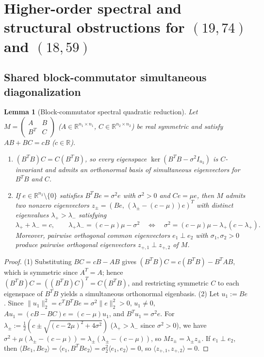 \documentclass[11pt,reqno]{amsart}
\newtheorem{lemma}[theorem]{Lemma}
\theoremstyle{definition}
\theoremstyle{remark}
\numberwithin{equation}{section}
\numberwithin{table}{section}
\begin{document}
\section{Higher-order spectral and structural obstructions for \texorpdfstring{$(19, 74)$}{(19, 74)} and \texorpdfstring{$(18, 59)$}{(18, 59)}}\label{sec:phase3_structural}

\subsection{Shared block-commutator simultaneous diagonalization}
\begin{lemma}[Block-commutator spectral quadratic reduction]\label{lem:block_comm}
Let $M = \left(\begin{smallmatrix} A & B \\ B^T & C \end{smallmatrix}\right)$ ($A \in \mathbb{R}^{n_1 \times n_1}$, $C \in \mathbb{R}^{n_2 \times n_2}$) be real symmetric and satisfy $AB + BC = c B$ ($c \in \mathbb{R}$).
\begin{enumerate}
  \item $(B^T B) C = C (B^T B)$, so every eigenspace $\ker(B^T B - \sigma^2 I_{n_2})$ is $C$-invariant and admits an orthonormal basis of simultaneous eigenvectors for $B^T B$ and $C$.
  \item If $e \in \mathbb{R}^{n_2} \setminus \{0\}$ satisfies $B^T B e = \sigma^2 e$ with $\sigma^2 > 0$ and $C e = \mu e$, then $M$ admits two nonzero eigenvectors $z_\pm = (Be,\, (\lambda_\pm - (c - \mu))e)^T$ with distinct eigenvalues $\lambda_+ > \lambda_-$ satisfying
  \[
    \lambda_+ + \lambda_- = c, \qquad \lambda_+ \lambda_- = (c - \mu)\mu - \sigma^2 \quad \Longleftrightarrow \quad \sigma^2 = (c - \mu)\mu - \lambda_+(c - \lambda_+).
  \]
  Moreover, pairwise orthogonal common eigenvectors $e_1 \perp e_2$ with $\sigma_1, \sigma_2 > 0$ produce pairwise orthogonal eigenvectors $z_{+,1} \perp z_{+,2}$ of $M$.
\end{enumerate}
\end{lemma}

\begin{proof}
(1) Substituting $BC = cB - AB$ gives $(B^T B)C = c(B^T B) - B^T A B$, which is symmetric since $A^T = A$; hence $(B^T B)C = ((B^T B)C)^T = C(B^T B)$, and restricting symmetric $C$ to each eigenspace of $B^T B$ yields a simultaneous orthonormal eigenbasis.
(2) Let $u_1 := Be$. Since $\|u_1\|_2^2 = e^T B^T B e = \sigma^2 \|e\|_2^2 > 0$, $u_1 \neq 0$, $A u_1 = (cB - BC)e = (c - \mu)u_1$, and $B^T u_1 = \sigma^2 e$. For $\lambda_\pm := \frac{1}{2}(c \pm \sqrt{(c - 2\mu)^2 + 4\sigma^2})$ ($\lambda_+ > \lambda_-$ since $\sigma^2 > 0$), we have $\sigma^2 + \mu(\lambda_\pm - (c - \mu)) = \lambda_\pm(\lambda_\pm - (c - \mu))$, so $M z_\pm = \lambda_\pm z_\pm$. If $e_1 \perp e_2$, then $\langle Be_1, Be_2 \rangle = \langle e_1, B^T B e_2 \rangle = \sigma_2^2 \langle e_1, e_2 \rangle = 0$, so $\langle z_{+,1}, z_{+,2} \rangle = 0$.
\end{proof}
\end{document}
